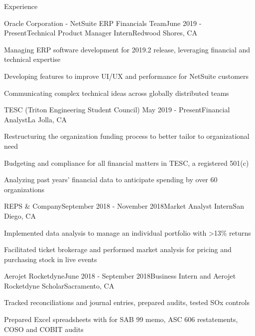 \documentclass{resume} %
\begin{document}
\begin{rSection}{\faCode{ }}{Experience}

\begin{rSubsection}{}{Oracle Corporation - NetSuite ERP Financials Team}{June 2019 - Present}{Technical Product Manager Intern}{Redwood Shores, CA}
\item Managing ERP software development for 2019.2 release, leveraging financial and technical expertise
\item Developing features to improve UI/UX and performance for NetSuite customers
\item Communicating complex technical ideas across globally distributed teams

\end{rSubsection}

\begin{rSubsection}{}{TESC (Triton Engineering Student Council) }{May 2019 - Present}{Financial Analyst}{La Jolla, CA}
\item Restructuring the organization funding process to better tailor to organizational need
\item Budgeting and compliance for all financial matters in TESC, a registered 501(c)
\item Analyzing past years' financial data to anticipate spending by over 60 organizations
\end{rSubsection}

\begin{rSubsection}{}{REPS \& Company}{September 2018 - November 2018}{Market Analyst Intern}{San Diego, CA}
\item Implemented data analysis to manage an individual portfolio with >13\% returns
\item Facilitated ticket brokerage and performed market analysis for pricing and purchasing stock in live events
\end{rSubsection}



\begin{rSubsection}{}{Aerojet Rocketdyne}{June 2018 - September 2018}{Business Intern and Aerojet Rocketdyne Scholar}{Sacramento, CA}
\item Tracked reconciliations and journal entries, prepared audits, tested SOx controls
\item Prepared Excel spreadsheets with for SAB 99 memo, ASC 606 restatements, COSO and COBIT audits
\end{rSubsection}

\end{rSection}
\end{document}
